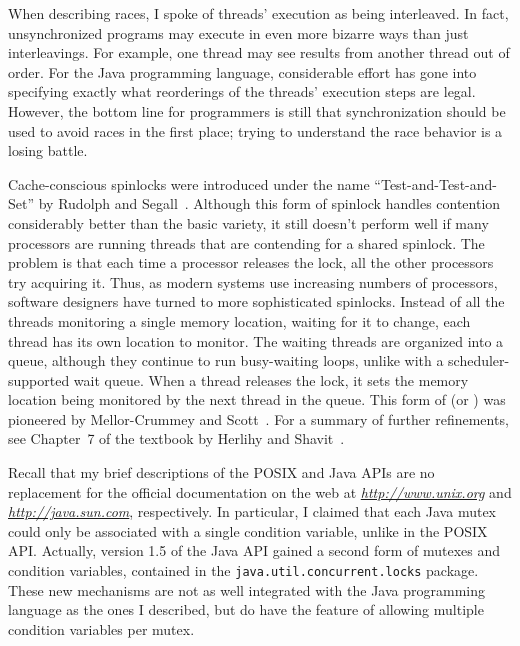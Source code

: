 When describing races, I spoke of threads' execution as being
interleaved.  In fact, unsynchronized programs may execute in even
more bizarre ways than just interleavings.  For example, one thread
may see results from another thread out of order.  For the Java programming
language, considerable effort has gone into specifying exactly what
reorderings of the threads' execution steps are legal.  However, the
bottom line for programmers is still that synchronization should be
used to avoid races in the first place; trying to understand the race
behavior is a losing battle.

Cache-conscious spinlocks were introduced under the name ``Test-and-Test-and-Set'' by Rudolph and Segall~\cite{max1200}.  Although this form of spinlock handles contention considerably better than the basic variety, it still doesn't perform well if many processors are running threads that are contending for a shared spinlock.  The problem is that each time a processor releases the lock, all the other processors try acquiring it. Thus, as modern systems use increasing numbers of processors, software designers have turned to more sophisticated spinlocks.  Instead of all the threads monitoring a single memory location, waiting for it to change, each thread has its own location to monitor.  The waiting threads are organized into a queue, although they continue to run busy-waiting loops, unlike with a scheduler-supported wait queue.  When a thread releases the lock, it sets the memory location being monitored by the next thread in the queue.  This form of  (or ) was pioneered by Mellor-Crummey and Scott~\cite{max1201}. For a summary of further refinements, see Chapter~7 of the textbook by Herlihy and Shavit~\cite{max1202}.

Recall that my brief descriptions of the POSIX and Java APIs are no
replacement for the official documentation on the web at
\textit{\url{http://www.unix.org}} and \textit{\url{http://java.sun.com}}, respectively.  In particular, I claimed that each Java mutex could only be associated with a single condition variable, unlike in the POSIX API. Actually, version 1.5 of the Java API gained a second form of mutexes and condition variables, contained in the \verb|java.util.|\linebreak[0]\verb|concurrent.locks| package. These new mechanisms are not as well integrated with the Java programming language as the ones I described, but do have the feature of allowing multiple condition variables per mutex.

